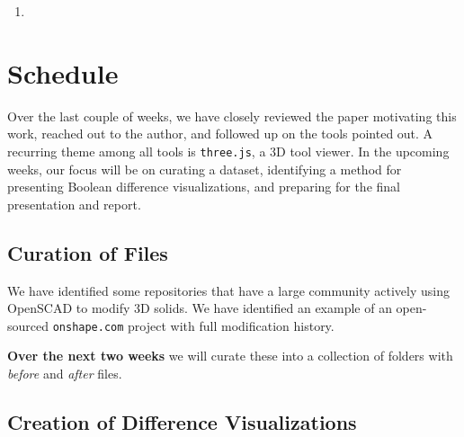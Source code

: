 \documentclass[sigconf,authorversion,nonacm]{acmart}
\begin{document}
\begin{enumerate}
\begin{description}
	      \end{description}
	\item
\end{enumerate}

\section{Schedule}

Over the last couple of weeks, we have closely reviewed the paper motivating this work, reached out to the author, and followed up on the tools pointed out. A recurring theme among all tools is \texttt{three.js}, a 3D tool viewer. In the upcoming weeks, our focus will be on curating a dataset, identifying a method for presenting Boolean difference visualizations, and preparing for the final presentation and report.


\subsection{Curation of Files}

We have identified some repositories that have a large community actively using OpenSCAD to modify 3D solids. We have identified an example of an open-sourced \texttt{onshape.com} project with full modification history.

\textbf{Over the next two weeks} we will curate these into a collection of folders with \emph{before} and \emph{after} files.

\subsection{Creation of Difference Visualizations}
\end{document}
